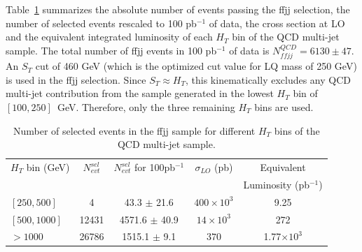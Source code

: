 Table~\ref{tab:ffjjSelection} summarizes 
the absolute number of events passing the ffjj selection, the number 
of selected events rescaled to 100 pb$^{-1}$ of data, the cross section at LO 
and the equivalent integrated luminosity of each $H_T$ 
bin of the QCD multi-jet sample. 
The total number of ffjj events in 100 pb$^{-1}$ of data is $N_{ffjj}^{QCD}=6130 \pm 47$.
An $S_{T}$ cut of 460 GeV (which is the optimized cut value for LQ mass of 250 GeV) is used in 
the ffjj selection.
Since $S_{T} \approx H_T$, this kinematically excludes any 
QCD multi-jet contribution from the sample generated in the lowest $H_T$ bin of $[100,250]$~GeV. 
Therefore, only the three remaining $H_T$ bins are used.

\begin{table}[htbp]
\begin{center}
\begin{tabular}{|l|c|c|c|c|}
\hline\hline
 $H_T$ bin (GeV)   & $N_{evt}^{sel}$ & $N_{evt}^{sel}$ for 100pb$^{-1}$ & $\sigma_{LO}$ (pb) & Equivalent           \\
                         &                 &                                  &                    & Luminosity (pb$^{-1}$) \\
\hline\hline
$[250,500]$              &  4              & 43.3    $\pm$ 21.6               & $400 \times 10^3$  &  9.25                \\
$[500,1000]$             &  12431          & 4571.6  $\pm$ 40.9               & $14 \times 10^3$   &  272                 \\
$>1000$                  &  26786          & 1515.1  $\pm$ 9.1                & $370$              &  1.77$\times 10^3$   \\
\hline\hline
\end{tabular}
\end{center}
\caption{Number of selected events in the ffjj sample for different $H_T$ bins of the QCD multi-jet sample.}
\label{tab:ffjjSelection}
\end{table}


